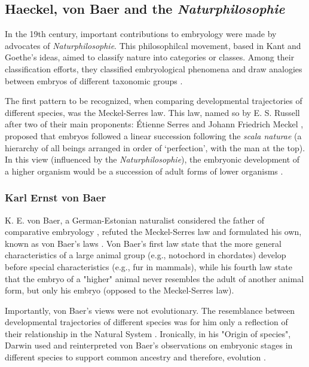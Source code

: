 \subsection{Haeckel, von Baer and the \textit{Naturphilosophie}}
In the 19th century, important contributions to embryology were made by advocates of \textit{Naturphilosophie}.
This philosophilcal movement, based in Kant and Goethe's ideas, aimed to classify nature into categories or classes. Among their classification efforts, they classified embryological phenomena and draw analogies between embryos of different taxonomic groups  \citep{Horder2010,Ghiselin2005}.

The first pattern to be recognized, when comparing developmental trajectories of different species, was the Meckel-Serres law. 
This law, named so by E. S. Russell after two of their main proponents: \'{E}tienne Serres and Johann Friedrich Meckel \citep{Russell1916}, proposed that embryos followed a linear succession following the \textit{scala naturae} (a hierarchy of all beings arranged in order of `perfection', with the man at the top).
In this view (influenced by the \textit{Naturphilosophie}), the embryonic development of a higher organism would be a succession of adult forms of lower organisms \citep{Russell1916,amundson2005changing}.

\subsubsection{Karl Ernst von Baer} \label{vonBaer}
K. E. von Baer, a German-Estonian naturalist considered the father of comparative embryology \citep{Russell1916}, refuted the Meckel-Serres law and formulated his own, known as von Baer's laws \citep{vonBaer1828uber}. 
Von Baer's first law state that the more general characteristics of a large animal group (e.g., notochord in chordates) develop before special characteristics (e.g., fur in mammals), while his fourth law state that the embryo of a "higher" animal never resembles the adult of another animal form, but only his embryo (opposed to the Meckel-Serres law). 

Importantly, von Baer's views were not evolutionary. The resemblance between developmental trajectories of different species was for him only a reflection of their relationship in the Natural System \citep{amundson2005changing}.
Ironically, in his "Origin of species", Darwin used and reinterpreted von Baer's observations on embryonic stages in different species to support common ancestry and therefore, evolution \citep{darwin1859origin}.

